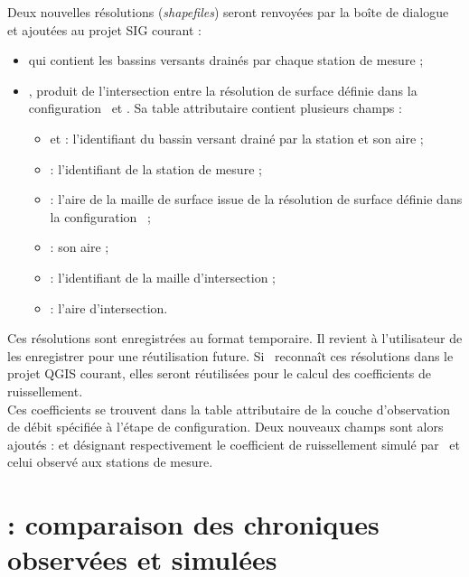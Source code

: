 Deux nouvelles résolutions (\textit{shapefiles}) seront renvoyées par la boîte de dialogue et ajoutées au projet SIG courant :
\begin{itemize}
    \item {} qui contient les bassins versants drainés par chaque station de mesure ;

    \item {}, produit de l'intersection entre la résolution de surface définie dans la configuration \cwv~et . Sa table attributaire contient plusieurs champs :
        \begin{itemize}
            \item[$-$]  et  : l'identifiant du bassin versant drainé par la station et son aire ;

            \item[$-$]  : l'identifiant de la station de mesure ;

            \item[$-$]  : l'aire de la maille de surface issue de la résolution de surface définie dans la configuration \cwv~;

            \item[$-$]  : son aire ;

            \item[$-$]  : l'identifiant de la maille d'intersection ;

            \item[$-$]  : l'aire d'intersection.
        \end{itemize}
\end{itemize}

Ces résolutions sont enregistrées au format temporaire. Il revient à l'utilisateur de les enregistrer pour une réutilisation future. Si \cwv~reconnaît ces résolutions dans le projet QGIS courant, elles seront réutilisées pour le calcul des coefficients de ruissellement.\\

Ces coefficients se trouvent dans la table attributaire de la couche d'observation de débit spécifiée à l'étape de configuration. Deux nouveaux champs sont alors ajoutés :  et  désignant respectivement le coefficient de ruissellement simulé par \cawaqs~et celui observé aux stations de mesure.

\section{ : comparaison des chroniques observées et simulées}
\label{sec-com-simobs}

